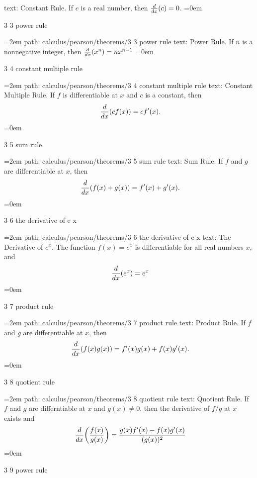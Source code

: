 \smallskip
text:  Constant Rule. If $c$ is a real number, then ${d \over dx}(c) = 0$.
\smallskip
\leftskip=0em
\par\endgroup
\bigskip
{}
3 3 power rule
\smallskip
\par\begingroup
\leftskip=2em
path: calculus/pearson/theorems/3 3 power rule
\smallskip
text:  Power Rule. If $n$ is a nonnegative integer, then ${d \over dx}(x^n) = nx^{n - 1}$
\smallskip
\leftskip=0em
\par\endgroup
\bigskip
{}
3 4 constant multiple rule
\smallskip
\par\begingroup
\leftskip=2em
path: calculus/pearson/theorems/3 4 constant multiple rule
\smallskip
text:  Constant Multiple Rule. If $f$ is differentiable at $x$ and $c$ is a constant, then $$\ {d \over dx}(cf(x)) = c f'(x). $$
\smallskip
\leftskip=0em
\par\endgroup
\bigskip
{}
3 5 sum rule
\smallskip
\par\begingroup
\leftskip=2em
path: calculus/pearson/theorems/3 5 sum rule
\smallskip
text:  Sum Rule. If $f$ and $g$ are differentiable at $x$, then  $$\ {d \over dx}(f(x) + g(x)) = f'(x) + g'(x). $$
\smallskip
\leftskip=0em
\par\endgroup
\bigskip
{}
3 6 the derivative of e x
\smallskip
\par\begingroup
\leftskip=2em
path: calculus/pearson/theorems/3 6 the derivative of e x
\smallskip
text:  The Derivative of $e^x$. The function $f(x) = e^x$ is differentiable for all real numbers $x$, and $$\ {d \over dx}(e^x) = e^x $$
\smallskip
\leftskip=0em
\par\endgroup
\bigskip
{}
3 7 product rule
\smallskip
\par\begingroup
\leftskip=2em
path: calculus/pearson/theorems/3 7 product rule
\smallskip
text:  Product Rule. If $f$ and $g$ are differentiable at $x$, then  $$\ {d \over dx}(f(x)g(x)) = f'(x)g(x) + f(x)g'(x). $$
\smallskip
\leftskip=0em
\par\endgroup
\bigskip
{}
3 8 quotient rule
\smallskip
\par\begingroup
\leftskip=2em
path: calculus/pearson/theorems/3 8 quotient rule
\smallskip
text:  Quotient Rule. If $f$ and $g$ are differntiable at $x$ and $g(x) \ne 0$, then the derivative of $f / g$ at $x$ exists and $$\ {d \over dx}\bigg({f(x) \over g(x)}\bigg) = { g(x)f'(x) - f(x)g'(x) \over (g(x))^2 } $$
\smallskip
\leftskip=0em
\par\endgroup
\bigskip
{}
3 9 power rule
\smallskip
